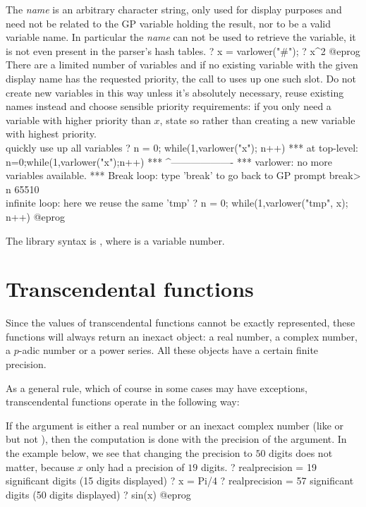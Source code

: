 The \emph{name} is an arbitrary character string, only used for display
purposes and need not be related to the GP variable holding the result, nor
to be a valid variable name. In particular the \emph{name} can
not be used to retrieve the variable, it is not even present in the parser's
hash tables.
\bprog
? x = varlower("#");
? x^2
@eprog
 There are a limited number of variables and if no
existing variable with the given display name has the requested
priority, the call to  uses up one such slot. Do not create
new variables in this way unless it's absolutely necessary,
reuse existing names instead and choose sensible priority requirements:
if you only need a variable with higher priority than $x$, state so
rather than creating a new variable with highest priority.
\bprog
\\ quickly use up all variables
? n = 0; while(1,varlower("x"); n++)
 ***   at top-level: n=0;while(1,varlower("x");n++)
 ***                             ^-------------------
 *** varlower: no more variables available.
 ***   Break loop: type 'break' to go back to GP prompt
break> n
65510
\\ infinite loop: here we reuse the same 'tmp'
? n = 0; while(1,varlower("tmp", x); n++)
@eprog

The library syntax is , where  is a variable number.

\section{Transcendental functions}\label{se:trans}

Since the values of transcendental functions cannot be exactly represented,
these functions will always return an inexact object: a real number,
a complex number, a $p$-adic number or a power series.  All these objects
have a certain finite precision.

As a general rule, which of course in some cases may have exceptions,
transcendental functions operate in the following way:

\item If the argument is either a real number or an inexact complex number
(like  or  but not ), then the
computation is done with the precision of the argument.
In the example below, we see that changing the precision to $50$ digits does
not matter, because $x$ only had a precision of $19$ digits.
\bprog
? 
   realprecision = 19 significant digits (15 digits displayed)
? x = Pi/4
? 
   realprecision = 57 significant digits (50 digits displayed)
? sin(x)
@eprog

